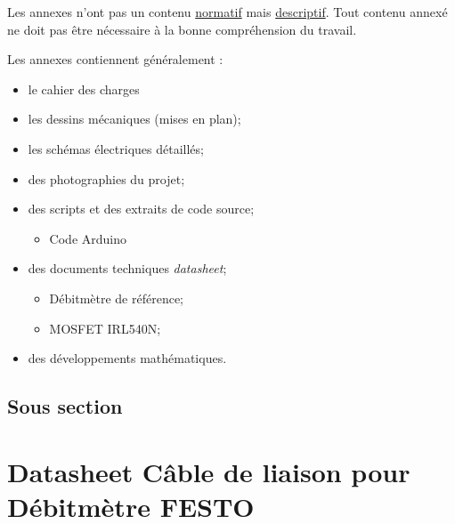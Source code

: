 \documentclass[
    iai & comatec, %
    mi, %
]{heig-tb}
\begin{document}
Les annexes n'ont pas un contenu \underline{normatif} mais \underline{descriptif}. Tout contenu annexé ne doit pas être nécessaire à la bonne compréhension du travail.

Les annexes contiennent généralement :

\begin{itemize}
    \item le cahier des charges
    \item les dessins mécaniques (mises en plan);
    \item les schémas électriques détaillés;
    \item des photographies du projet;
    \item des scripts et des extraits de code source;
          \begin{itemize}
              \item Code Arduino
          \end{itemize}
    \item des documents techniques \pex \emph{datasheet};
          \begin{itemize}
              \item Débitmètre de référence;
              \item MOSFET IRL540N;
          \end{itemize}
    \item des développements mathématiques.
\end{itemize}
\section{Sous section}
\lipsum[1]

\chapter{Datasheet Câble de liaison pour Débitmètre FESTO}


\let\cleardoublepage\clearpage
\backmatter

\label{index}
\printindex

%
\end{document}
